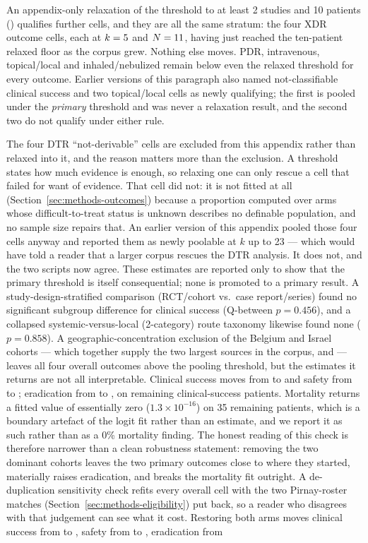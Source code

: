 An appendix-only relaxation of the threshold to at least 2 studies and 10 patients () qualifies \RelaxNewlyPoolable further cells, and they are all the same stratum: the four XDR outcome cells, each at $k=5$ and $N=11$, having just reached the ten-patient relaxed floor as the corpus grew. Nothing else moves. PDR, intravenous, topical/local and inhaled/nebulized remain below even the relaxed threshold for every outcome. Earlier versions of this paragraph also named not-classifiable clinical success and two topical/local cells as newly qualifying; the first is pooled under the \emph{primary} threshold and was never a relaxation result, and the second two do not qualify under either rule.

The four DTR ``not-derivable'' cells are excluded from this appendix rather than relaxed into it, and the reason matters more than the exclusion. A threshold states how much evidence is enough, so relaxing one can only rescue a cell that failed for want of evidence. That cell did not: it is not fitted at all (Section~\ref{sec:methods-outcomes}) because a proportion computed over arms whose difficult-to-treat status is unknown describes no definable population, and no sample size repairs that. An earlier version of this appendix pooled those four cells anyway and reported them as newly poolable at $k$ up to 23 --- which would have told a reader that a larger corpus rescues the DTR analysis. It does not, and the two scripts now agree. These estimates are reported only to show that the primary threshold is itself consequential; none is promoted to a primary result. A study-design-stratified comparison (RCT/cohort vs.\ case report/series) found no significant subgroup difference for clinical success (Q-between $p=0.456$), and a collapsed systemic-versus-local (2-category) route taxonomy likewise found none ($p=0.858$). A geographic-concentration exclusion of the Belgium and Israel cohorts --- which together supply the two largest sources in the corpus, \citeauthor{Pirnay2024_natmicrobiol} and \citeauthor{Onallah2023_med} --- leaves all four overall outcomes above the pooling threshold, but the estimates it returns are not all interpretable. Clinical success moves from \GeoCsFull to \GeoCsExcl and safety from \GeoSafFull to \GeoSafExcl ; eradication from \GeoEradFull to \GeoEradExcl , on \GeoCsExclN remaining clinical-success patients. Mortality returns a fitted value of essentially zero ($1.3\times10^{-16}$) on 35 remaining patients, which is a boundary artefact of the logit fit rather than an estimate, and we report it as such rather than as a 0\% mortality finding. The honest reading of this check is therefore narrower than a clean robustness statement: removing the two dominant cohorts leaves the two primary outcomes close to where they started, materially raises eradication, and breaks the mortality fit outright. A de-duplication sensitivity check refits every overall cell with the two Pirnay-roster matches (Section~\ref{sec:methods-eligibility}) put back, so a reader who disagrees with that judgement can see what it cost. Restoring both arms moves clinical success from \DedupCsApplied to \DedupCsRestored , safety from \DedupSafApplied to \DedupSafRestored , eradication from 